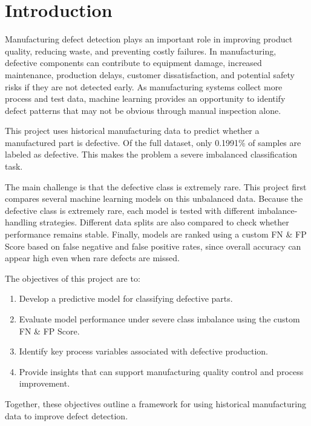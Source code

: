 \documentclass{article}
\begin{document}
\section{Introduction}

Manufacturing defect detection plays an important role in improving product
quality, reducing waste, and preventing costly failures. In manufacturing,
defective components can contribute to equipment damage, increased maintenance,
production delays, customer dissatisfaction, and potential safety risks if they
are not detected early. As manufacturing systems collect more process and test
data, machine learning provides an opportunity to identify defect patterns that
may not be obvious through manual inspection alone.

This project uses historical manufacturing data to predict whether a manufactured part is defective. Of the full dataset, only 0.1991\% of samples are labeled as defective. This makes the problem a severe imbalanced classification task.

The main challenge is that the defective class is extremely rare. This project first compares several machine learning models on this unbalanced data.
Because the defective class is extremely rare, each model is tested with
different imbalance-handling strategies. Different data splits are also compared to
check whether performance remains stable. Finally, models are ranked using a custom FN \& FP Score based on false
negative and false positive rates, since overall accuracy can appear high even
when rare defects are missed. 

The objectives of this project are to:

\begin{enumerate}
    \item Develop a predictive model for classifying defective parts.
    \item Evaluate model performance under severe class imbalance using the custom FN \& FP Score.
    \item Identify key process variables associated with defective production.
    \item Provide insights that can support manufacturing quality control and process improvement.
\end{enumerate}

Together, these objectives outline a framework for using historical manufacturing
data to improve defect detection.
\end{document}
